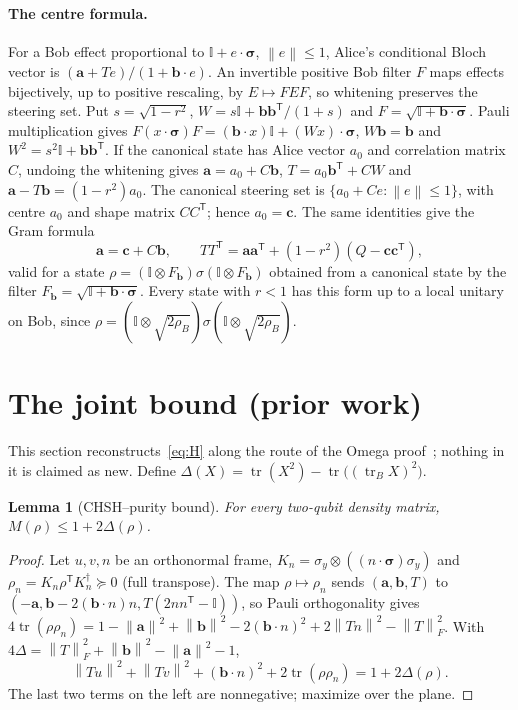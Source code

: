 \documentclass[11pt]{article}
\newtheorem{lemma}[theorem]{Lemma}
\theoremstyle{remark}\newtheorem{remark}[theorem]{Remark}
\DeclareMathOperator{\tr}{tr}\DeclareMathOperator{\diag}{diag}
\newcommand{\id}{\mathbb I}\newcommand{\ket}[1]{|#1\rangle}
\newcommand{\norm}[1]{\left\lVert#1\right\rVert}
\newcommand{\cv}{\bm c}\newcommand{\av}{\bm a}\newcommand{\bv}{\bm b}
\begin{document}
\paragraph{The centre formula.}
For a Bob effect proportional to $\id+e\cdot\bm\sigma$, $\norm e\le1$, Alice's
conditional Bloch vector is $(\av+Te)/(1+\bv\cdot e)$. An invertible positive
Bob filter $F$ maps effects bijectively, up to positive rescaling, by
$E\mapsto FEF$, so whitening preserves the steering set. Put $s=\sqrt{1-r^2}$,
$W=s\id+\bv\bv^{\mathsf T}/(1+s)$ and $F=\sqrt{\id+\bv\cdot\bm\sigma}$. Pauli
multiplication gives $F(x\cdot\bm\sigma)F=(\bv\cdot x)\id+(Wx)\cdot\bm\sigma$,
$W\bv=\bv$ and $W^2=s^2\id+\bv\bv^{\mathsf T}$. If the canonical state has Alice
vector $a_0$ and correlation matrix $C$, undoing the whitening gives
$\av=a_0+C\bv$, $T=a_0\bv^{\mathsf T}+CW$ and $\av-T\bv=(1-r^2)a_0$. The
canonical steering set is $\{a_0+Ce:\norm e\le1\}$, with centre $a_0$ and shape
matrix $CC^{\mathsf T}$; hence $a_0=\cv$. The same identities give the Gram
formula
\begin{equation}\label{eq:gram}
 \av=\cv+C\bv,\qquad
 TT^{\mathsf T}=\av\av^{\mathsf T}+(1-r^2)(Q-\cv\cv^{\mathsf T}),
\end{equation}
valid for a state $\rho=(\id\otimes F_{\bv})\sigma(\id\otimes F_{\bv})$ obtained
from a canonical state by the filter $F_{\bv}=\sqrt{\id+\bv\cdot\bm\sigma}$.
Every state with $r<1$ has this form up to a local unitary on Bob, since
$\rho=(\id\otimes\sqrt{2\rho_B})\sigma(\id\otimes\sqrt{2\rho_B})$.

\section{The joint bound (prior work)}\label{sec:prior}

This section reconstructs~\eqref{eq:H} along the route of the Omega
proof~\cite{dossier}; nothing in it is claimed as new. Define
$\Delta(X)=\tr(X^2)-\tr\bigl((\tr_BX)^2\bigr)$.

\begin{lemma}[CHSH--purity bound]\label{lem:purity}
For every two-qubit density matrix, $M(\rho)\le1+2\Delta(\rho)$.
\end{lemma}
\begin{proof}
Let $u,v,n$ be an orthonormal frame, $K_n=\sigma_y\otimes((n\cdot\bm\sigma)\sigma_y)$
and $\rho_n=K_n\rho^{\mathsf T}K_n^\dagger\succeq0$ (full transpose). The map
$\rho\mapsto\rho_n$ sends $(\av,\bv,T)$ to
$(-\av,\bv-2(\bv\cdot n)n,T(2nn^{\mathsf T}-\id))$, so Pauli orthogonality gives
$4\tr(\rho\rho_n)=1-\norm{\av}^2+\norm{\bv}^2-2(\bv\cdot n)^2+2\norm{Tn}^2-\norm{T}_F^2$.
With $4\Delta=\norm{T}_F^2+\norm{\bv}^2-\norm{\av}^2-1$,
\begin{equation}\label{eq:flip}
 \norm{Tu}^2+\norm{Tv}^2+(\bv\cdot n)^2+2\tr(\rho\rho_n)=1+2\Delta(\rho).
\end{equation}
The last two terms on the left are nonnegative; maximize over the plane.
\end{proof}
\end{document}

